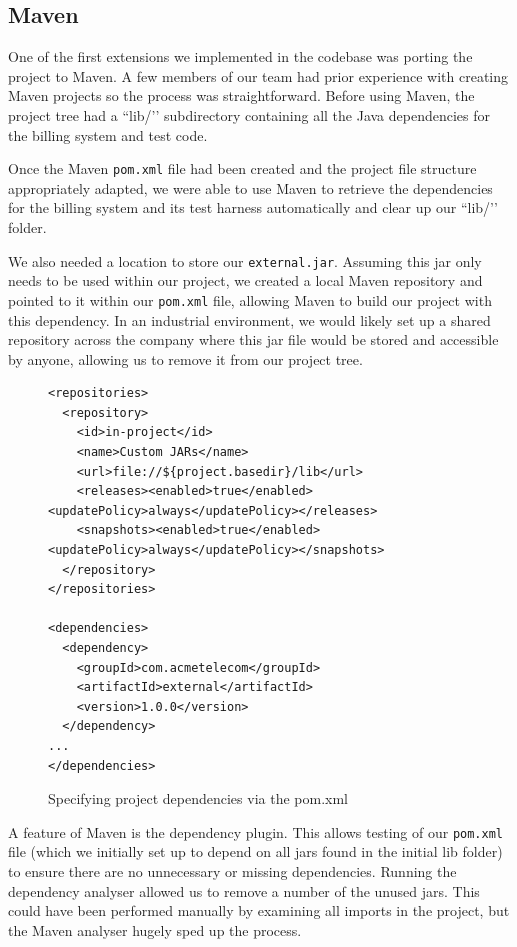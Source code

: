 \documentclass[a4paper]{article}
\begin{document}
\subsection{Maven}

One of the first extensions we implemented in the codebase was porting the project to Maven. A few members of our team had prior experience with creating Maven projects so the process was straightforward. Before using Maven, the project tree had a ``lib/’’ subdirectory containing all the Java dependencies for the billing system and test code. 

Once the Maven \verb+pom.xml+ file had been created and the project file structure appropriately adapted, we were able to use Maven to retrieve the dependencies for the billing system and its test harness automatically and clear up our ``lib/’’ folder.

We also needed a location to store our \verb+external.jar+. Assuming this jar only needs to be used within our project, we created a local Maven repository and pointed to it within our \verb+pom.xml+ file, allowing Maven to build our project with this dependency. In an industrial environment, we would likely set
up a shared repository across the company where this jar file would be stored
and accessible by anyone, allowing us to remove it from our project tree.


\begin{figure}[h]
\begin{verbatim}  
<repositories>
  <repository>
    <id>in-project</id>
    <name>Custom JARs</name>
    <url>file://${project.basedir}/lib</url>
    <releases><enabled>true</enabled><updatePolicy>always</updatePolicy></releases>
    <snapshots><enabled>true</enabled><updatePolicy>always</updatePolicy></snapshots>
  </repository>
</repositories>

<dependencies>
  <dependency>
    <groupId>com.acmetelecom</groupId>
    <artifactId>external</artifactId>
    <version>1.0.0</version>
  </dependency>
...
</dependencies>
\end{verbatim}
\caption{Specifying project dependencies via the pom.xml}
\end{figure}
A feature of Maven is the dependency plugin. This allows testing of our \verb+pom.xml+ file
(which we initially set up to depend on all jars found in the initial lib folder)
to ensure there are no unnecessary or missing dependencies. Running the
dependency analyser allowed us to remove a number of the unused jars. This could have been performed manually by examining all imports
in the project, but the Maven analyser hugely sped up the process.
\end{document}

